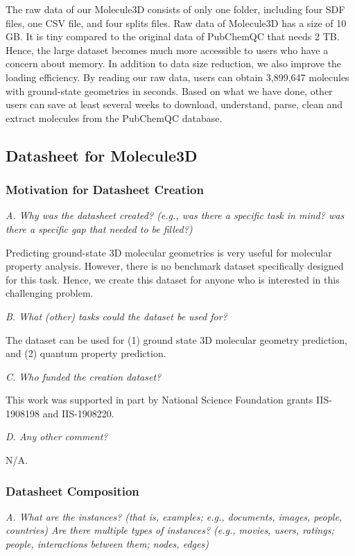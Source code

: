 \documentclass{article}
\begin{document}
The raw data of our Molecule3D consists of only one folder, including four SDF files, one CSV file, and four splits files. Raw data of Molecule3D has a size of 10 GB. It is tiny compared to the original data of PubChemQC that needs 2 TB. Hence, the large dataset becomes much more accessible to users who have a concern about memory. In addition to data size reduction, we also improve the loading efficiency. By reading our raw data, users can obtain 3,899,647 molecules with ground-state geometries in seconds. Based on what we have done, other users can save at least several weeks to download, understand, parse, clean and extract molecules from the PubChemQC database. 

\subsection{Datasheet for Molecule3D}

\subsubsection{Motivation for Datasheet Creation}

\textit{A. Why was the datasheet created? (e.g., was there a specific task in mind? was there a specific gap that needed to be filled?)}

Predicting ground-state 3D molecular geometries is very useful for molecular property analysis. However, there is no benchmark dataset specifically designed for this task. Hence, we create this dataset for anyone who is interested in this challenging problem.

\textit{B. What (other) tasks could the dataset be used for?}

The dataset can be used for (1) ground state 3D molecular geometry prediction, and (2) quantum property prediction.

\textit{C. Who funded the creation dataset?}

This work was supported in part by National Science Foundation grants IIS-1908198 and IIS-1908220.

\textit{D. Any other comment?}

N/A.

\subsubsection{Datasheet Composition}
\textit{A. What are the instances? (that is, examples; e.g., documents, images, people, countries) Are there multiple types of instances? (e.g., movies, users, ratings; people, interactions between them; nodes, edges)}
\end{document}
